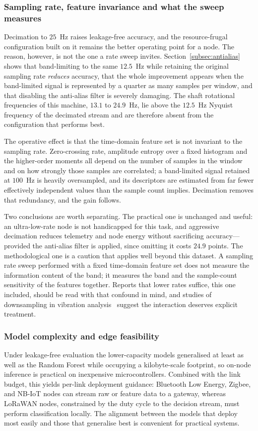 \subsubsection{Sampling rate, feature invariance and what the sweep measures}
Decimation to $25$~Hz raises leakage-free accuracy, and the resource-frugal
configuration built on it remains the better operating point for a node. The
reason, however, is not the one a rate sweep invites. Section~\ref{subsec:antialias}
shows that band-limiting to the same $12.5$~Hz while retaining the original
sampling rate \emph{reduces} accuracy, that the whole improvement appears when the
band-limited signal is represented by a quarter as many samples per window, and
that disabling the anti-alias filter is severely damaging. The shaft rotational
frequencies of this machine, $13.1$ to $24.9$~Hz, lie above the $12.5$~Hz Nyquist
frequency of the decimated stream and are therefore absent from the configuration
that performs best.

The operative effect is that the time-domain feature set is not invariant to the
sampling rate. Zero-crossing rate, amplitude entropy over a fixed histogram and
the higher-order moments all depend on the number of samples in the window and on
how strongly those samples are correlated; a band-limited signal retained at
$100$~Hz is heavily oversampled, and its descriptors are estimated from far fewer
effectively independent values than the sample count implies. Decimation removes
that redundancy, and the gain follows.

Two conclusions are worth separating. The practical one is unchanged and useful:
an ultra-low-rate node is not handicapped for this task, and aggressive decimation
reduces telemetry and node energy without sacrificing accuracy---provided the
anti-alias filter is applied, since omitting it costs $24.9$ points. The
methodological one is a caution that applies well beyond this dataset. A sampling
rate sweep performed with a fixed time-domain feature set does not measure the
information content of the band; it measures the band and the sample-count
sensitivity of the features together. Reports that lower rates suffice, this one
included, should be read with that confound in mind, and studies of downsampling
in vibration analysis~\cite{he2021sampling} suggest the interaction deserves
explicit treatment.

\subsubsection{Model complexity and edge feasibility}
Under leakage-free evaluation the lower-capacity models generalised at least as
well as the Random Forest while occupying a kilobyte-scale footprint, so on-node
inference is practical on inexpensive microcontrollers. Combined with the link
budget, this yields per-link deployment guidance: Bluetooth Low Energy, Zigbee,
and NB-IoT nodes can stream raw or feature data to a gateway, whereas LoRaWAN
nodes, constrained by the duty cycle to the decision stream, must perform
classification locally. The alignment between the models that deploy most easily
and those that generalise best is convenient for practical systems.

